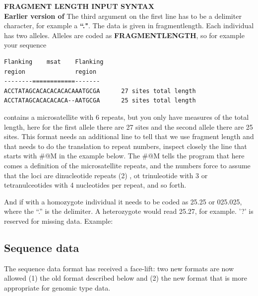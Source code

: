 \textbf{FRAGMENT LENGTH INPUT SYNTAX}\\
\textbf{Earlier version of }
The third argument on the first line has to be a delimiter character, for example a \textbf{``."}.
The data is given in fragmentlength. Each individual has two alleles.
Alleles are coded as \textbf{FRAGMENTLENGTH}, so for example your 
sequence 
\begin{verbatim}
Flanking    msat    Flanking
region              region 
--------============-------
ACCTATAGCACACACACACAAATGCGA      27 sites total length
ACCTATAGCACACACACA--AATGCGA      25 sites total length
\end{verbatim}
contains a microsatellite with 6 repeats, but you only have measures of the total length, here for the first allele there are 27 sites and the second allele there are 25 sites. This format needs an additional line to tell \migrate that we use fragment length and that \migrate needs to do the translation to repeat numbers, inspect closely the line that starts with \#@M in the example below. The \#@M tells the program that here comes a definition of the 
microsatellite repeats, and the numbers force \migrate to assume that the loci are dinucleotide repeats (2) , ot trinuleotide with 3 or tetranulceotides with 4 nucleotides per repeat, and so forth. 

And if with a homozygote individual
it needs to be coded as 25.25 or 025.025, where the ``.'' is the delimiter. A heterozygote would read 25.27, for example.
 '?' is reserved for missing data.
\smallerskip
Example:
\begin{flushleft}
\begin{small}
\end{small}
\end{flushleft}
\subsection{Sequence data}
The sequence data format has received a face-lift: two new formats are now allowed (1) the old format described below and (2) the new format that is more appropriate for genomic type data.

